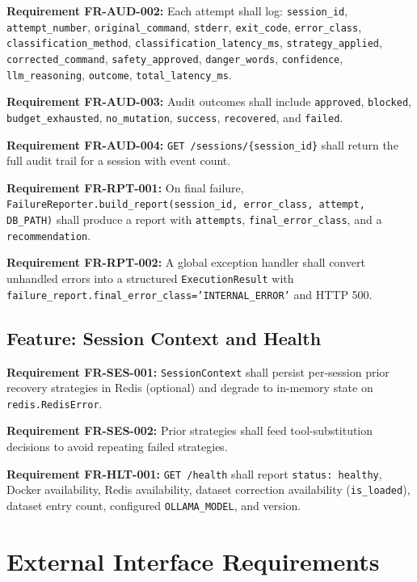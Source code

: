 \documentclass[10pt,journal,onecolumn]{IEEEtran}
\newcommand{\reqid}[1]{\textbf{#1}}
\begin{document}
\reqid{Requirement FR-AUD-002:} Each attempt shall log: \texttt{session\_id}, \texttt{attempt\_number}, \texttt{original\_command}, \texttt{stderr}, \texttt{exit\_code}, \texttt{error\_class}, \texttt{classification\_method}, \texttt{classification\_\allowbreak latency\_\allowbreak ms}, \texttt{strategy\_applied}, \texttt{corrected\_command}, \texttt{safety\_approved}, \texttt{danger\_words}, \texttt{confidence}, \texttt{llm\_reasoning}, \texttt{outcome}, \texttt{total\_latency\_ms}.

\reqid{Requirement FR-AUD-003:} Audit outcomes shall include \texttt{approved}, \texttt{blocked}, \texttt{budget\_exhausted}, \texttt{no\_mutation}, \texttt{success}, \texttt{recovered}, and \texttt{failed}.

\reqid{Requirement FR-AUD-004:} \texttt{GET /\allowbreak sessions/\allowbreak \{session\_\allowbreak id\}} shall return the full audit trail for a session with event count.

\reqid{Requirement FR-RPT-001:} On final failure, \texttt{FailureReporter.\allowbreak build\_\allowbreak report(session\_\allowbreak id, error\_\allowbreak class, attempt, DB\_\allowbreak PATH)} shall produce a report with \texttt{attempts}, \texttt{final\_error\_class}, and a \texttt{recommendation}.

\reqid{Requirement FR-RPT-002:} A global exception handler shall convert unhandled errors into a structured \texttt{ExecutionResult} with \texttt{failure\_\allowbreak report.\allowbreak final\_\allowbreak error\_\allowbreak class='INTERNAL\_\allowbreak ERROR'} and HTTP 500.

\subsection{Feature: Session Context and Health}

\reqid{Requirement FR-SES-001:} \texttt{SessionContext} shall persist per-session prior recovery strategies in Redis (optional) and degrade to in-memory state on \texttt{redis.RedisError}.

\reqid{Requirement FR-SES-002:} Prior strategies shall feed tool-substitution decisions to avoid repeating failed strategies.

\reqid{Requirement FR-HLT-001:} \texttt{GET /health} shall report \texttt{status: healthy}, Docker availability, Redis availability, dataset correction availability (\texttt{is\_loaded}), dataset entry count, configured \texttt{OLLAMA\_MODEL}, and version.

\section{External Interface Requirements}
\end{document}
